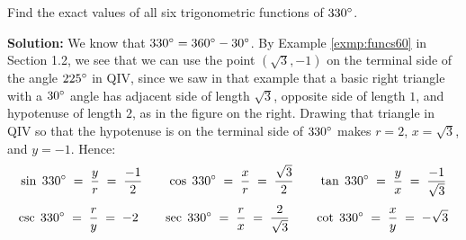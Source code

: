 \begin{exmp}\label{exmp:funcs330}
\noindent Find the exact values of all six trigonometric functions of $330^\circ$.\vspace{1mm}
 \par\noindent\textbf{Solution:} We know that $330^\circ = 360^\circ - 30^\circ$. By
 Example \ref{exmp:funcs60} in Section 1.2, we see that we can use the point $(\sqrt{3},-1)$ on
 the terminal side of the angle $225^\circ$ in QIV, since we saw in that example that a basic
 right triangle with a $30^\circ$ angle has adjacent side of length $\sqrt{3}$, opposite side of
 length $1$, and hypotenuse of length $2$, as in the figure on the right. Drawing that
 triangle in QIV so that the hypotenuse is on the terminal side of $330^\circ$ makes
 $r = 2$, $x=\sqrt{3}$, and $y=-1$. Hence:
 \begin{displaymath}
  \sin\;330\Degrees \;=\; \dfrac{y}{r} \;=\; \dfrac{-1}{2} \qquad
  \cos\;330\Degrees \;=\; \dfrac{x}{r} \;=\; \dfrac{\sqrt{3}}{2} \qquad
  \tan\;330\Degrees \;=\; \dfrac{y}{x} \;=\; \dfrac{-1}{\sqrt{3}}\vspace{1mm}
 \end{displaymath}
 \begin{displaymath}
  \csc\;330\Degrees \;=\; \dfrac{r}{y} \;=\; -2 \qquad
  \sec\;330\Degrees \;=\; \dfrac{r}{x} \;=\; \dfrac{2}{\sqrt{3}} \qquad
  \cot\;330\Degrees \;=\; \dfrac{x}{y} \;=\; -\sqrt{3}\vspace{1mm}
 \end{displaymath}
\end{exmp}\vspace{-2mm}
